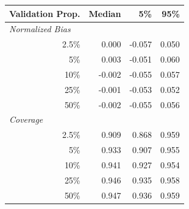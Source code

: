 
\begin{tabular}{r|rrr}
\toprule
Validation Prop. & Median & 5\% & 95\%\\
\midrule
\multicolumn{1}{l|}{\textit{Normalized Bias}}\\
2.5\% & 0.000 & -0.057 & 0.050\\
5\% & 0.003 & -0.051 & 0.060\\
10\% & -0.002 & -0.055 & 0.057\\
25\% & -0.001 & -0.053 & 0.052\\
50\% & -0.002 & -0.055 & 0.056\\
\midrule
%
\multicolumn{1}{l|}{\textit{Coverage}}\\
2.5\% & 0.909 & 0.868 & 0.959\\
5\% & 0.933 & 0.907 & 0.955\\
10\% & 0.941 & 0.927 & 0.954\\
25\% & 0.946 & 0.935 & 0.958\\
50\% & 0.947 & 0.936 & 0.959\\
\bottomrule
\end{tabular}
